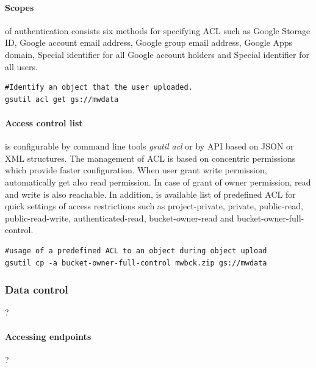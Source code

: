 \documentclass[a4paper,12pt,oneside]{report}
\begin{document}
\paragraph{Scopes}\label{par:scopes}of authentication consists six methods for 
specifying ACL such as  Google Storage ID, Google account email address, Google 
group email address, Google Apps domain, Special identifier for all Google 
account holders and Special identifier for all users.

\begin{footnotesize}\begin{lstlisting}[style=mybash]
#Identify an object that the user uploaded.
gsutil acl get gs://mwdata
\end{lstlisting}\end{footnotesize}
 

\paragraph{Access control list} is configurable by command line tools \textit{gsutil acl} 
or by API based on JSON or XML structures. The management of ACL is based on concentric 
permissions which provide faster configuration. When user grant 
write permission, automatically get also read permission. In case of grant of owner 
permission, read and write is also reachable. In addition, is available 
list of predefined ACL for quick settings of access restrictions such as project-private, 
private, public-read, public-read-write, authenticated-read, 
bucket-owner-read and bucket-owner-full-control.

\begin{footnotesize}\begin{lstlisting}[style=mybash]
#usage of a predefined ACL to an object during object upload
gsutil cp -a bucket-owner-full-control mwbck.zip gs://mwdata
\end{lstlisting}\end{footnotesize}
 


\subsubsection{Data control}
?

\paragraph{Accessing endpoints}
?
\end{document}
